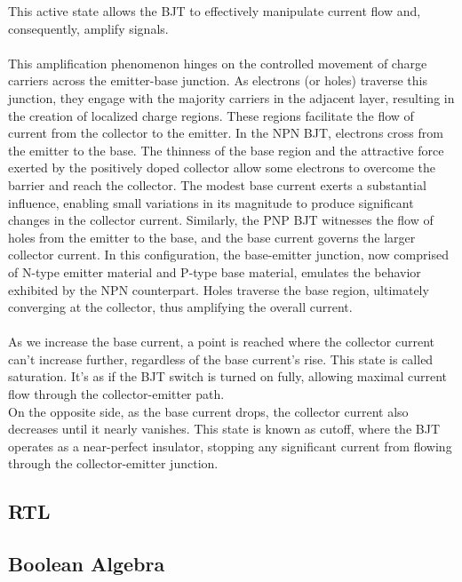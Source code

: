         This active state allows the BJT to effectively manipulate current flow and, consequently, amplify signals. \\\\
        This amplification phenomenon hinges on the controlled movement of charge carriers across the emitter-base junction. 
        As electrons (or holes) traverse this junction, they engage with the majority carriers in the adjacent layer, resulting in the creation of localized charge regions. 
        These regions facilitate the flow of current from the collector to the emitter. In the NPN BJT, electrons cross from the emitter to the base. 
        The thinness of the base region and the attractive force exerted by the positively doped collector allow some electrons to overcome the barrier and reach the collector. 
        The modest base current exerts a substantial influence, enabling small variations in its magnitude to produce significant changes in the collector current. 
        Similarly, the PNP BJT witnesses the flow of holes from the emitter to the base, and the base current governs the larger collector current. 
        In this configuration, the base-emitter junction, now comprised of N-type emitter material and P-type base material, emulates the behavior exhibited by the NPN counterpart. 
        Holes traverse the base region, ultimately converging at the collector, thus amplifying the overall current. \\\\
        As we increase the base current, a point is reached where the collector current can't increase further, regardless of the base current's rise. 
        This state is called saturation. It's as if the BJT switch is turned on fully, allowing maximal current flow through the collector-emitter path. \\
        On the opposite side, as the base current drops, the collector current also decreases until it nearly vanishes. 
        This state is known as cutoff, where the BJT operates as a near-perfect insulator, stopping any significant current from flowing through the collector-emitter junction.

    \subsection{RTL}
        
    \subsection{Boolean Algebra}
        
    